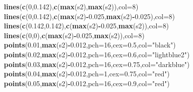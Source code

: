 \documentclass[]{article}
\newenvironment{Shaded}{\begin{snugshade}}{\end{snugshade}}
\newcommand{\DataTypeTok}[1]{\textcolor[rgb]{0.13,0.29,0.53}{#1}}
\newcommand{\DecValTok}[1]{\textcolor[rgb]{0.00,0.00,0.81}{#1}}
\newcommand{\FloatTok}[1]{\textcolor[rgb]{0.00,0.00,0.81}{#1}}
\newcommand{\KeywordTok}[1]{\textcolor[rgb]{0.13,0.29,0.53}{\textbf{#1}}}
\newcommand{\NormalTok}[1]{#1}
\newcommand{\OperatorTok}[1]{\textcolor[rgb]{0.81,0.36,0.00}{\textbf{#1}}}
\newcommand{\StringTok}[1]{\textcolor[rgb]{0.31,0.60,0.02}{#1}}
\begin{document}
\begin{Shaded}
\begin{Highlighting}[]
\KeywordTok{lines}\NormalTok{(}\KeywordTok{c}\NormalTok{(}\DecValTok{0}\NormalTok{,}\FloatTok{0.142}\NormalTok{),}\KeywordTok{c}\NormalTok{(}\KeywordTok{max}\NormalTok{(s2),}\KeywordTok{max}\NormalTok{(s2)),}\DataTypeTok{col=}\DecValTok{8}\NormalTok{)}
\KeywordTok{lines}\NormalTok{(}\KeywordTok{c}\NormalTok{(}\DecValTok{0}\NormalTok{,}\FloatTok{0.142}\NormalTok{),}\KeywordTok{c}\NormalTok{(}\KeywordTok{max}\NormalTok{(s2)}\OperatorTok{-}\FloatTok{0.025}\NormalTok{,}\KeywordTok{max}\NormalTok{(s2)}\OperatorTok{-}\FloatTok{0.025}\NormalTok{),}\DataTypeTok{col=}\DecValTok{8}\NormalTok{)}
\KeywordTok{lines}\NormalTok{(}\KeywordTok{c}\NormalTok{(}\FloatTok{0.142}\NormalTok{,}\FloatTok{0.142}\NormalTok{),}\KeywordTok{c}\NormalTok{(}\KeywordTok{max}\NormalTok{(s2)}\OperatorTok{-}\FloatTok{0.025}\NormalTok{,}\KeywordTok{max}\NormalTok{(s2)),}\DataTypeTok{col=}\DecValTok{8}\NormalTok{)}
\KeywordTok{lines}\NormalTok{(}\KeywordTok{c}\NormalTok{(}\DecValTok{0}\NormalTok{,}\DecValTok{0}\NormalTok{),}\KeywordTok{c}\NormalTok{(}\KeywordTok{max}\NormalTok{(s2)}\OperatorTok{-}\FloatTok{0.025}\NormalTok{,}\KeywordTok{max}\NormalTok{(s2)),}\DataTypeTok{col=}\DecValTok{8}\NormalTok{)}
\KeywordTok{points}\NormalTok{(}\FloatTok{0.01}\NormalTok{,}\KeywordTok{max}\NormalTok{(s2)}\OperatorTok{-}\FloatTok{0.012}\NormalTok{,}\DataTypeTok{pch=}\DecValTok{16}\NormalTok{,}\DataTypeTok{cex=}\FloatTok{0.5}\NormalTok{,}\DataTypeTok{col=}\StringTok{"black"}\NormalTok{)}
\KeywordTok{points}\NormalTok{(}\FloatTok{0.02}\NormalTok{,}\KeywordTok{max}\NormalTok{(s2)}\OperatorTok{-}\FloatTok{0.012}\NormalTok{,}\DataTypeTok{pch=}\DecValTok{16}\NormalTok{,}\DataTypeTok{cex=}\FloatTok{0.6}\NormalTok{,}\DataTypeTok{col=}\StringTok{"lightblue2"}\NormalTok{)}
\KeywordTok{points}\NormalTok{(}\FloatTok{0.03}\NormalTok{,}\KeywordTok{max}\NormalTok{(s2)}\OperatorTok{-}\FloatTok{0.012}\NormalTok{,}\DataTypeTok{pch=}\DecValTok{16}\NormalTok{,}\DataTypeTok{cex=}\FloatTok{0.75}\NormalTok{,}\DataTypeTok{col=}\StringTok{"darkblue"}\NormalTok{)}
\KeywordTok{points}\NormalTok{(}\FloatTok{0.04}\NormalTok{,}\KeywordTok{max}\NormalTok{(s2)}\OperatorTok{-}\FloatTok{0.012}\NormalTok{,}\DataTypeTok{pch=}\DecValTok{1}\NormalTok{,}\DataTypeTok{cex=}\FloatTok{0.75}\NormalTok{,}\DataTypeTok{col=}\StringTok{"red"}\NormalTok{)}
\KeywordTok{points}\NormalTok{(}\FloatTok{0.05}\NormalTok{,}\KeywordTok{max}\NormalTok{(s2)}\OperatorTok{-}\FloatTok{0.012}\NormalTok{,}\DataTypeTok{pch=}\DecValTok{16}\NormalTok{,}\DataTypeTok{cex=}\FloatTok{0.9}\NormalTok{,}\DataTypeTok{col=}\StringTok{"red"}\NormalTok{)}


\end{Highlighting}
\end{Shaded}
\end{document}
